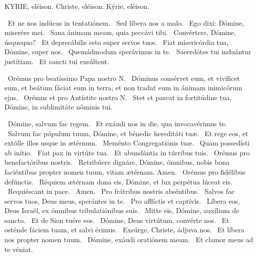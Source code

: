 
KYRIE, eléison. Christe, eléison. Kýrie, eléison.

 \V\ Et ne nos indúcas in tentatiónem. \R\ Sed líbera nos a malo. \V\ Ego dixi: Dómine, miserére mei. \R\ Sana ánimam meam, quia peccávi tibi. \V\ Convértere, Dómine, úsquequo? \R\ Et deprecábilis esto super servos tuos. \V\ Fiat misericórdia tua, Dómine, super nos. \R\ Quemádmodum sperávimus in te. \V\ Sacerdótes tui induántur justítiam. \R\ Et sancti tui exsúltent.

\V\ Orémus pro beatíssimo Papa nostro N. \R\ Dóminus consérvet eum, et vivíficet eum, et beátum fáciat eum in terra, et non tradat eum in ánimam inimicórum ejus. \V\ Orémus et pro Antístite nostro N. \R\ Stet et pascat in fortitúdine tua, Dómine, in sublimitáte nóminis tui.


\V\ Dómine, salvum fac regem. \R\ Et exáudi nos in die, qua invocavérimus te. \V\ Salvum fac pópulum tuum, Dómine, et bénedic hereditáti tuæ. \R\ Et rege eos, et extólle illos usque in ætérnum. \V\ Meménto Congregatiónis tuæ. \R\ Quam possedísti ab inítio. \V\ Fiat pax in virtúte tua. \R\ Et abundántia in túrribus tuis. \V\ Orémus pro benefactóribus nostris. \R\ Retribúere dignáre, Dómine, ómnibus, nobis bona faciéntibus propter nomen tuum, vitam ætérnam. Amen. \V\ Orémus pro fidélibus defúnctis. \R\ Réquiem ætérnam dona eis, Dómine, et lux perpétua lúceat eis. \V\ Requiéscant in pace. \R\ Amen. \V\ Pro frátribus nostris abséntibus. \R\ Salvos fac servos tuos, Deus meus, sperántes in te. \V\ Pro afflíctis et captívis. \R\ Líbera eos, Deus Israël, ex ómnibus tribulatiónibus suis. \V\ Mitte eis, Dómine, auxílium de sancto. \R\ Et de Sion tuére eos. \V\ Dómine, Deus virtútum, convérte nos. \R\ Et osténde fáciem tuam, et salvi érimus. \V\ Exsúrge, Christe, ádjuva nos. \R\ Et líbera nos propter nomen tuum. \V\ Dómine, exáudi oratiónem meam. \R\ Et clamor meus ad te véniat.

